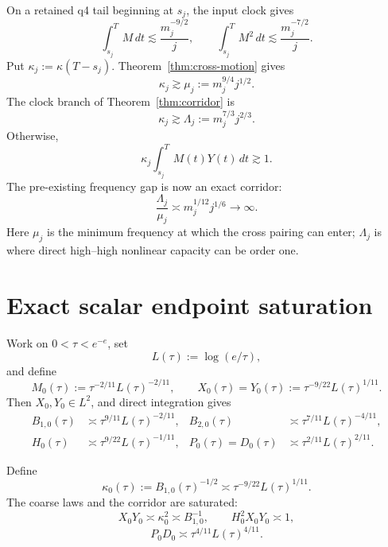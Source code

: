 \documentclass[11pt]{article}
\theoremstyle{remark}
\begin{document}
On a retained q4 tail beginning at \(s_j\), the input clock gives
\begin{equation}
\label{eq:record-tails}
 \int_{s_j}^T M\,dt
 \lesssim
 \frac{m_j^{-9/2}}j,
 \qquad
 \int_{s_j}^T M^2\,dt
 \lesssim
 \frac{m_j^{-7/2}}j.
\end{equation}
Put \(\kappa_j:=\kappa(T-s_j)\).  Theorem~\ref{thm:cross-motion} gives
\begin{equation}
\label{eq:mu}
 \boxed{
 \kappa_j
 \gtrsim
 \mu_j:=m_j^{9/4}j^{1/2}.
 }
\end{equation}
The clock branch of Theorem~\ref{thm:corridor} is
\begin{equation}
\label{eq:Lambda}
 \boxed{
 \kappa_j
 \gtrsim
 \Lambda_j:=m_j^{7/3}j^{2/3}.
 }
\end{equation}
Otherwise,
\begin{equation}
\label{eq:record-corridor}
 \boxed{
 \kappa_j
 \int_{s_j}^T M(t)Y(t)\,dt
 \gtrsim1.
 }
\end{equation}
The pre-existing frequency gap is now an exact corridor:
\begin{equation}
\label{eq:frequency-gap}
 \frac{\Lambda_j}{\mu_j}
 \asymp
 m_j^{1/12}j^{1/6}
 \longrightarrow\infty.
\end{equation}
Here \(\mu_j\) is the minimum frequency at which the cross pairing can
enter; \(\Lambda_j\) is where direct high--high nonlinear capacity can
be order one.

\section{Exact scalar endpoint saturation}

Work on \(0<\tau<e^{-e}\), set
\[
 L(\tau):=\log(e/\tau),
\]
and define
\begin{equation}
\label{eq:scalar-functions}
 M_0(\tau)
 :=
 \tau^{-2/11}L(\tau)^{-2/11},
 \qquad
 X_0(\tau)=Y_0(\tau)
 :=
 \tau^{-9/22}L(\tau)^{1/11}.
\end{equation}
Then \(X_0,Y_0\in L^2\), and direct integration gives
\begin{align}
\label{eq:scalar-integrals}
 B_{1,0}(\tau)
 &\asymp
 \tau^{9/11}L(\tau)^{-2/11},
 &
 B_{2,0}(\tau)
 &\asymp
 \tau^{7/11}L(\tau)^{-4/11},
 \\
 H_0(\tau)
 &\asymp
 \tau^{9/22}L(\tau)^{-1/11},
 &
 P_0(\tau)=D_0(\tau)
 &\asymp
 \tau^{2/11}L(\tau)^{2/11}.
\end{align}

Define
\begin{equation}
\label{eq:scalar-kappa}
 \kappa_0(\tau)
 :=
 B_{1,0}(\tau)^{-1/2}
 \asymp
 \tau^{-9/22}L(\tau)^{1/11}.
\end{equation}
The coarse laws and the corridor are saturated:
\begin{equation}
\label{eq:scalar-saturation}
 X_0Y_0
 \asymp
 \kappa_0^2
 \asymp
 B_{1,0}^{-1},
 \qquad
 H_0^2X_0Y_0\asymp1,
\end{equation}
\[
 P_0D_0
 \asymp
 \tau^{4/11}L(\tau)^{4/11}.
\]
\end{document}
